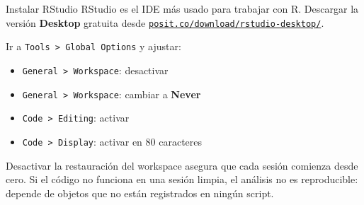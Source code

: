 \documentclass[8pt]{beamer}
\begin{document}
	\begin{frame}{Instalar RStudio}
		RStudio es el IDE más usado para trabajar con R. Descargar la versión \textbf{Desktop} gratuita desde \href{https://posit.co/download/rstudio-desktop/}{\texttt{posit.co/download/rstudio-desktop/}}.

		Ir a \texttt{Tools > Global Options} y ajustar:

		\begin{itemize}
			\item \texttt{General > Workspace}: desactivar 
			\item \texttt{General > Workspace}: cambiar  a \textbf{Never}
			\item \texttt{Code > Editing}: activar 
			\item \texttt{Code > Display}: activar  en 80 caracteres
		\end{itemize}

		\begin{exampleblock}{}
			Desactivar la restauración del workspace asegura que cada sesión comienza desde cero. Si el código no funciona en una sesión limpia, el análisis no es reproducible: depende de objetos que no están registrados en ningún script.
		\end{exampleblock}
	\end{frame}
\end{document}

